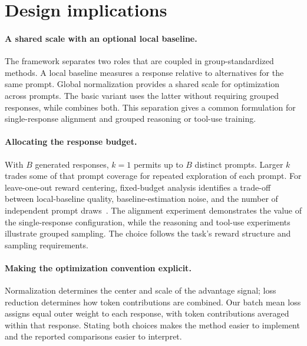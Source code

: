 \section{Design implications}\label{sec:discussion}
\paragraph{A shared scale with an optional local baseline.}
The framework separates two roles that are coupled in group-standardized methods. A local baseline measures a response relative to alternatives for the same prompt. Global normalization provides a shared scale for optimization across prompts. The basic variant uses the latter without requiring grouped responses, while \baseline combines both. This separation gives a common formulation for single-response alignment and grouped reasoning or tool-use training.

\paragraph{Allocating the response budget.}
With $B$ generated responses, $k=1$ permits up to $B$ distinct prompts. Larger $k$ trades some of that prompt coverage for repeated exploration of each prompt. For leave-one-out reward centering, fixed-budget analysis identifies a trade-off between local-baseline quality, baseline-estimation noise, and the number of independent prompt draws~\citep{hu2026groupbatch}. The alignment experiment demonstrates the value of the single-response configuration, while the reasoning and tool-use experiments illustrate grouped sampling. The choice follows the task's reward structure and sampling requirements.

\paragraph{Making the optimization convention explicit.}
Normalization determines the center and scale of the advantage signal; loss reduction determines how token contributions are combined. Our batch mean loss assigns equal outer weight to each response, with token contributions averaged within that response. Stating both choices makes the method easier to implement and the reported comparisons easier to interpret.
